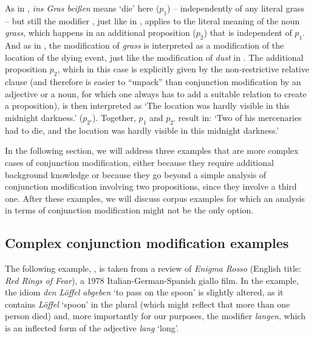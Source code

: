 \documentclass[output=paper]{langsci/langscibook}
\begin{document}
\noindent As in , \textit{ins Gras beißen} means `die' here ($p_{1}$) -- independently of any literal grass -- but still the modifier \underline{}, just like \underline{} in , applies to the literal meaning of the noun \textit{grass}, which happens in an additional proposition ($p_{2}$) that is independent of $p_{1}$. And as in , the modification of \textit{grass} is interpreted as a modification of the location of the dying event, just like the modification of \textit{dust} in . The additional proposition $p_{2}$, which in this case is explicitly given by the non-restrictive relative clause (and therefore is easier to ``unpack'' than conjunction modification by an adjective or a noun, for which one always has to add a suitable relation to create a proposition), is then interpreted as `The location was hardly visible in this midnight darkness.' ($p_{2'}$). Together, $p_{1}$ and $p_{2'}$ result in: `Two of his mercenaries had to die, and the location was hardly visible in this midnight darkness.' 

In the following section, we will address three examples that are more complex cases of conjunction modification, either because they require additional background knowledge or because they go beyond a simple analysis of conjunction modification involving two propositions, since they involve a third one. After these examples, we will discuss corpus examples for which an analysis in terms of conjunction modification might not be the only option.



\subsection{Complex conjunction modification examples} \label{complex cases}

The following example, , is taken from a review of \textit{Enigma Rosso} (English title: \textit{Red Rings of Fear}), a 1978 Italian-German-Spanish giallo film. In the example, the idiom \textit{den Löffel abgeben} `to pass on the spoon' is slightly altered, as it contains \textit{Löffel} `spoon' in the plural (which might reflect that more than one person died) and, more importantly for our purposes, the modifier \textit{langen}, which is an inflected form of the adjective \textit{lang} `long'.
\end{document}
